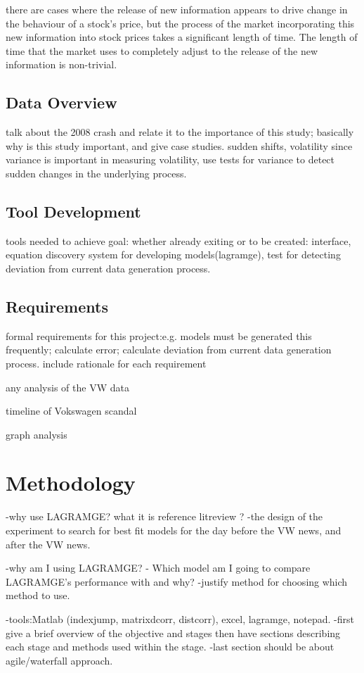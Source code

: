 \documentclass[13pt]{report}
\begin{document}
 there are cases where the release of new information appears to drive change in the behaviour of a stock's price, but the process of the market incorporating this new information into stock prices takes a significant length of time. The length of time that the market uses to completely adjust to the release of the new information is non-trivial.



\section{Data Overview}

talk about the 2008 crash and relate it to the importance of this study; basically why is this study important, and give case studies.
sudden shifts, volatility
since variance is important in measuring volatility, use tests for variance to detect sudden changes in the underlying process.


\section{Tool Development}
tools needed to achieve goal: whether already exiting or to be created: interface, equation discovery system for developing models(lagramge), test for detecting deviation from current data generation process.
\section{Requirements}
formal requirements for this project:e.g. models must be generated this frequently; calculate error; calculate deviation from current data generation process. 
include rationale for each requirement

any analysis of the VW data\par
timeline of Vokswagen scandal\par
graph analysis \par


\chapter{Methodology}
-why use LAGRAMGE? what it is reference litreview ?
-the design of the experiment to search for best fit models for the day before the VW news, and after the VW news.\par
-why am I using LAGRAMGE?
- Which model am I going to compare LAGRAMGE's performance with and why?
-justify method for choosing which method to use.\par
-tools:Matlab (indexjump, matrixdcorr, distcorr), excel, lagramge, notepad.
-first give a brief overview of the objective and stages then have sections describing each stage and methods used within the stage.
-last section should be about agile/waterfall approach. 
\end{document}
